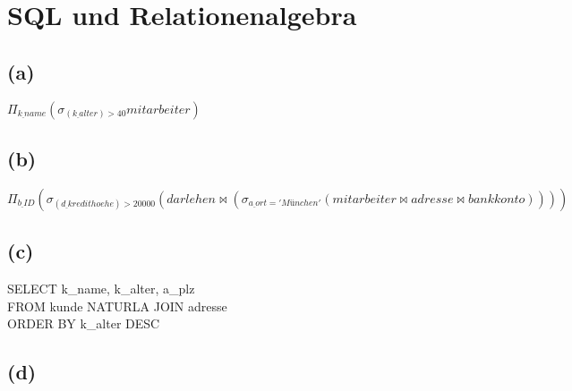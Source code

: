 \documentclass{article}
\begin{document}
\section{SQL und Relationenalgebra}
\subsection{(a)}
$\Pi_{k \underline{ }name}(\sigma_{(k \underline{ }alter)> 40} mitarbeiter)$

\subsection{(b)}
$\Pi_{b\underline{ }ID}(\sigma_{(d\underline{ }kredithoehe)>20000} (darlehen \bowtie (\sigma_{a\underline{ }ort='München'}(mitarbeiter \bowtie adresse \bowtie bankkonto)))) $


\subsection{(c)}
SELECT k_name, k_alter, a_plz \\
FROM kunde NATURLA JOIN adresse \\
ORDER BY k_alter DESC \\

\subsection{(d)}
\end{document}
